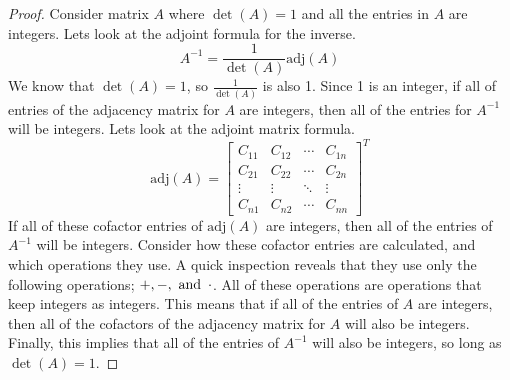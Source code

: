 \documentclass{article}
\begin{document}
\begin{proof}
    Consider matrix $A$ where $\det(A) = 1$ and all the entries in $A$ are integers. Lets look at the adjoint formula for the inverse.
    \[
        A^{-1} = \frac{1}{\det(A)}\text{adj}(A)
    \]
    We know that $\det(A) = 1$, so $\frac{1}{\det(A)}$ is also 1. Since 1 is an integer, if all of entries of the adjacency matrix for $A$ are integers, then all of the entries for $A^{-1}$ will be integers. Lets look at the adjoint matrix formula.
    \[
        \text{adj}(A) = \begin{bmatrix}
            C_{11} & C_{12} & \cdots & C_{1n} \\
            C_{21} & C_{22} & \cdots & C_{2n} \\
            \vdots & \vdots & \ddots & \vdots \\
            C_{n1} & C_{n2} & \cdots & C_{nn}
        \end{bmatrix}^T
    \]
    If all of these cofactor entries of $\text{adj}(A)$ are integers, then all of the entries of $A^{-1}$ will be integers. Consider how these cofactor entries are calculated, and which operations they use. A quick inspection reveals that they use only the following operations; $+,-, \operatorname{~\text{and}~} \cdot$. All of these operations are operations that keep integers as integers. This means that if all of the entries of $A$ are integers, then all of the cofactors of the adjacency matrix for $A$ will also be integers. Finally, this implies that all of the entries of $A^{-1}$ will also be integers, so long as $\det(A) = 1$.
\end{proof}
\qdash
\end{document}

